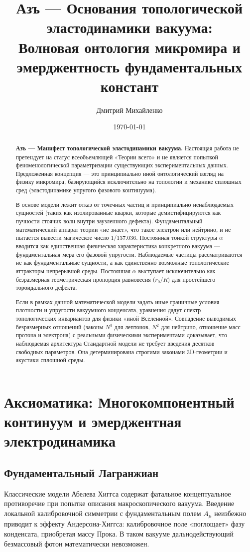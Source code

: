 \documentclass[11pt,a4paper]{article}
\title{\textbf{Азъ — Основания топологической\\ эластодинамики вакуума:\\ Волновая онтология микромира и эмерджентность фундаментальных констант}}
\author{Дмитрий Михайленко}
\date{\today}
\begin{document}
	
	\maketitle
	
	\begin{abstract}
		\textbf{Азъ — Манифест топологической эластодинамики вакуума.} 
		Настоящая работа не претендует на статус всеобъемлющей «Теории всего» и не является попыткой феноменологической параметризации существующих экспериментальных данных. Предложенная концепция — это принципиально иной онтологический взгляд на физику микромира, базирующийся исключительно на топологии и механике сплошных сред (эластодинамике упругого фазового континуума).
		
		В основе модели лежит отказ от точечных частиц и принципиально ненаблюдаемых сущностей (таких как изолированные кварки, которые демистифицируются как пучности стоячих волн внутри заузленного дефекта). Фундаментальный математический аппарат теории «не знает», что такое электрон или нейтрино, и не пытается вывести магическое число $1/137.036$. Постоянная тонкой структуры $\alpha$ вводится как единственная физическая характеристика конкретного вакуума — фундаментальная мера его фазовой упругости. Наблюдаемые частицы рассматриваются не как фундаментальные сущности, а как единственно возможные топологические аттракторы непрерывной среды. Постоянная $\alpha$ выступает исключительно как безразмерная геометрическая пропорция равновесия ($r_0/R$) для простейшего тороидального дефекта. 
		
		Если в рамках данной математической модели задать иные граничные условия плотности и упругости вакуумного конденсата, уравнения дадут спектр топологических инвариантов для физики «иной Вселенной». Совпадение выводимых безразмерных отношений (законы $N^3$ для лептонов, $N^2$ для нейтрино, отношение масс протона и электрона) с реальными физическими экспериментами доказывает, что наблюдаемая архитектура Стандартной модели не требует введения десятков свободных параметров. Она детерминирована строгими законами 3D-геометрии и акустики сплошной среды.
	\end{abstract}
	
	\section{Аксиоматика: Многокомпонентный континуум и эмерджентная электродинамика}
	
	\subsection{Фундаментальный Лагранжиан}
	Классические модели Абелева Хиггса содержат фатальное концептуальное противоречие при попытке описания макроскопического вакуума. Введение локальной калибровочной симметрии с фундаментальным полем $A_\mu$ неизбежно приводит к эффекту Андерсона-Хиггса: калибровочное поле «поглощает» фазу конденсата, приобретая массу Прока. В таком вакууме дальнодействующий безмассовый фотон математически невозможен.
	
\end{document}
